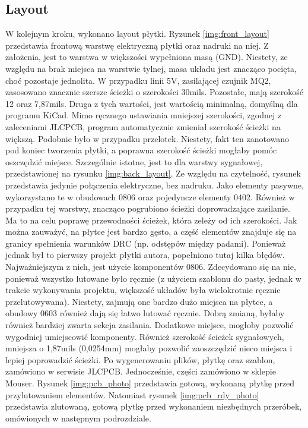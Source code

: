 \subsection{Layout}
W kolejnym kroku, wykonano layout płytki. Ryzunek \ref{img:front_layout} przedstawia frontową warstwę elektryczną płytki oraz nadruki na niej. Z założenia, jest to warstwa w większości wypełniona masą (GND). Niestety, ze względu na brak miejsca na warstwie tylnej, masa układu jest znacząco pocięta, choć pozostaje jednolita. W przypadku linii 5V, zasilającej czujnik MQ2, zasosowano znacznie szersze ścieżki o szerokości 30mils. Pozostałe, mają szerokość 12 oraz 7,87mils. Druga z tych wartości, jest wartością minimalną, domyślną dla programu KiCad. Mimo ręcznego ustawiania mniejszej szerokości, zgodnej z zaleceniami JLCPCB\cite{jlcpcb_specification}, program automatycznie zmieniał szerokość ścieżki na większą. Podobnie było w przypadku przelotek. Niestety, fakt ten zanotowano pod koniec tworzenia płytki, a poprawna szerokość ścieżki mogłaby pomóc oszczędzić miejsce. Szczególnie istotne, jest to dla warstwy sygnałowej, przedstawionej na rysunku \ref{img:back_layout}. Ze względu na czytelność, rysunek przedstawia jedynie połączenia elektryczne, bez nadruku. Jako elementy pasywne, wykorzystano te w obudowach 0806 oraz pojedyncze elementy 0402. Również w przypadku tej warstwy, znacząco pogrubiono ścieżki doprowadzające zasilanie. Ma to na celu poprawę przewodności ścieżek, która zeleży od ich szerokości. Jak można zauważyć, na płytce jest bardzo gęsto, a część elementów znajduje się na granicy spełnienia warunków DRC (np. odstępów między padami). Ponieważ jednak był to pierwszy projekt płytki autora, popełniono tutaj kilka błędów. Najważniejszym z nich, jest użycie komponentów 0806. Zdecydowano się na nie, ponieważ wszystko lutowane było ręcznie (z użyciem szablonu do pasty, jednak w trakcie wykonywania projektu, większość układów była wielokrotnie ręcznie przelutowywana). Niestety, zajmują one bardzo dużo miejsca na płytce, a obudowy 0603 również dają się łatwo lutować ręcznie. Dobrą zmianą, byłaby również bardziej zwarta sekcja zasilania. Dodatkowe miejsce, mogłoby pozwolić wygodniej umiejscowić komponenty. Również szerokość ścieżek sygnałowych, mniejsza o 1,87mils (0,0254mm) mogłaby pozwolić zaoszczędzić nieco miejsca i lepiej poprowadzić ścieżki.
\newline
Po wygenerowaniu plików, płytkę oraz szablon, zamówiono w serwisie JLCPCB. Jednocześnie, części zamówiono w sklepie Mouser. Rysunek \ref{img:pcb_photo} przedstawia gotową, wykonaną płytkę przed przylutowaniem elementów. Natomiast rysunek \ref{img:pcb_rdy_photo} przedstawia zlutowaną, gotową płytkę przed wykonaniem niezbędnych przeróbek, omówionych w następnym podrozdziale. 

